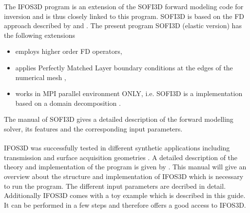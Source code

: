 The IFOS3D program is an extension of the SOFI3D forward modeling code for inversion and is thus closely linked to this program. SOFI3D is based on the FD approach described by \cite{Vir86} and \cite{Lev88}. The present program SOFI3D (elastic version) has the following extensions
\begin{itemize}
\item employs higher order FD operators,
\item applies Perfectly Matched Layer boundary conditions at the edges of the numerical mesh \citep{Kom07},
\item works in MPI parallel environment ONLY, i.e. SOFI3D is a implementation based on a domain decomposition
\citep{boh02}.
\end{itemize}
The manual of SOFI3D gives a detailed description of the forward modelling solver, its features and the corresponding input parameters.\\
\\
IFOS3D was successfully tested in different synthetic applications including transmission and surface acquisition geometries \citep{But13,But15}. A detailed description of the theory and implementation of the program is given by \cite{But15}. This manual will give an overview about the structure and implementation of IFOS3D which is necessary to run the program. The different input parameters are decribed in detail. Additionally IFOS3D comes with a toy example which is described in this guide. It can be performed in a few steps and therefore offers a good access to IFOS3D.
 